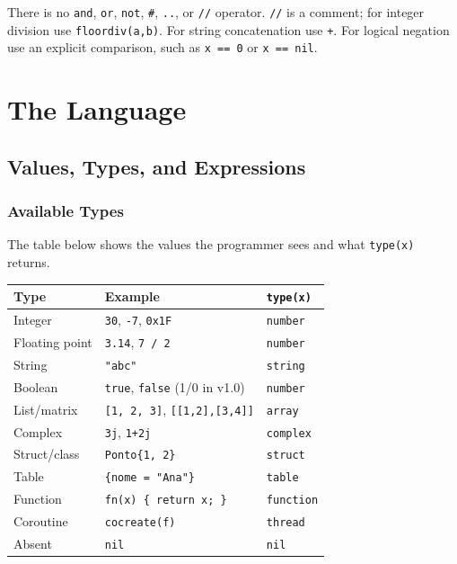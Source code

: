 \documentclass[11pt,a4paper,oneside]{report}
\newcommand{\code}[1]{\texttt{#1}}
\begin{document}
There is no \code{and}, \code{or}, \code{not}, \code{\#}, \code{..},
or \code{//} operator. \code{//} is a comment; for integer division use
\code{floordiv(a,b)}. For string concatenation use \code{+}. For logical
negation use an explicit comparison, such as \code{x == 0} or
\code{x == nil}.

\part{The Language}

\chapter{Values, Types, and Expressions}
\label{cap:valores}

\section{Available Types}
The table below shows the values the programmer sees and what
\code{type(x)} returns.

\begin{center}
\begin{longtable}{L{3.4cm}L{7.4cm}L{3.2cm}}
\toprule
Type & Example & \code{type(x)} \\
\midrule
Integer & \code{30}, \code{-7}, \code{0x1F} & \code{number} \\
Floating point & \code{3.14}, \code{7 / 2} & \code{number} \\
String & \code{"abc"} & \code{string} \\
Boolean & \code{true}, \code{false} (1/0 in v1.0) & \code{number} \\
List/matrix & \code{[1, 2, 3]}, \code{[[1,2],[3,4]]} & \code{array} \\
Complex & \code{3j}, \code{1+2j} & \code{complex} \\
Struct/class & \code{Ponto\{1, 2\}} & \code{struct} \\
Table & \code{\{nome = "Ana"\}} & \code{table} \\
Function & \code{fn(x) \{ return x; \}} & \code{function} \\
Coroutine & \code{cocreate(f)} & \code{thread} \\
Absent & \code{nil} & \code{nil} \\
\bottomrule
\end{longtable}
\end{center}
\end{document}
